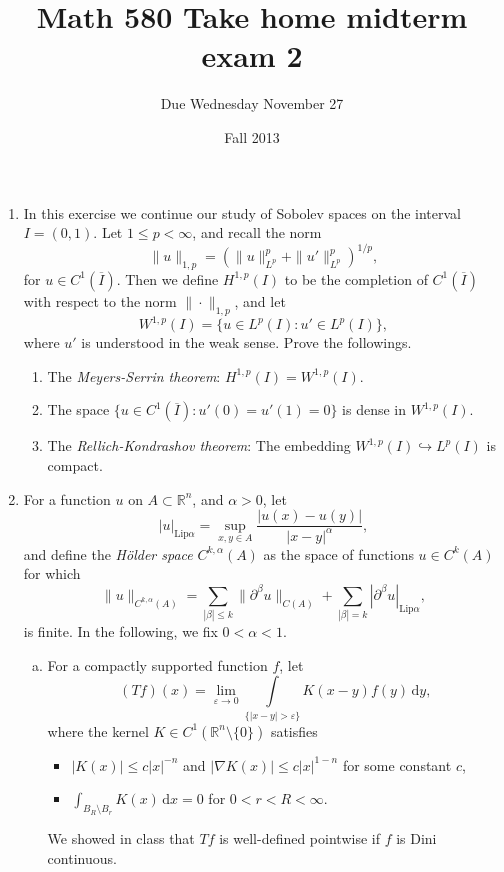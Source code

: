 \documentclass[11pt,reqno]{amsart}
\title{Math 580 Take home midterm exam 2}
\author{Due Wednesday November 27}
\date{Fall 2013}                                           %
\newcommand{\R}{\mathbb{R}}
\newcommand{\eps}{\varepsilon}
\newcommand{\exd}{\mathrm{d}}
\newcommand{\Lip}{\mathrm{Lip}}
\begin{document}
\maketitle

\begin{enumerate}[1.]
\item
In this exercise we continue our study of Sobolev spaces on the interval $I=(0,1)$.
Let $1\leq p < \infty$, and recall the norm
$$
\|u\|_{1,p} = \left( \|u\|_{L^p}^p + \|u'\|_{L^p}^p \right)^{1/p},
$$
for $u\in C^1(\overline I)$.
Then we define $H^{1,p}(I)$ to be the completion of $C^1(\overline I)$ with respect to the norm $\|\cdot\|_{1,p}$,
and let
$$
W^{1,p}(I) = \{ u\in L^p(I) : u' \in L^p(I) \},
$$
where $u'$ is understood in the weak sense.
Prove the followings.
\begin{enumerate}
\item
The {\em Meyers-Serrin theorem}: $H^{1,p}(I)=W^{1,p}(I)$.
\item
The space $\{u\in C^1(\overline I):u'(0)=u'(1)=0\}$ is dense in $W^{1,p}(I)$.
\item
The {\em Rellich-Kondrashov theorem}:
The embedding $W^{1,p}(I)\hookrightarrow L^p(I)$ is compact.
\end{enumerate}
\item
For a function $u$ on $A\subset\R^n$, and $\alpha>0$, let
$$
|u|_{\Lip\alpha} = \sup_{x,y\in A}\frac{|u(x)-u(y)|}{|x-y|^\alpha},
$$
and define the {\em H\"older space} $C^{k,\alpha}(A)$ as the space of functions $u\in C^k(A)$ for which
$$
\|u\|_{C^{k,\alpha}(A)} 
= \sum_{|\beta|\leq k} \|\partial^\beta u\|_{C(A)}
+ \sum_{|\beta|=k} |\partial^\beta u|_{\Lip\alpha},
$$
is finite.
In the following, we fix $0<\alpha<1$.
\begin{enumerate}[(a)]
\item
For a compactly supported function $f$, let 
$$
(Tf)(x) = \lim_{\eps\to0} \int\limits_{\{|x-y|>\eps\}} K(x-y) f(y) \,\exd y,
$$
where the kernel $K\in C^1(\R^n\setminus\{0\})$ satisfies
\begin{itemize}
\item
$|K(x)|\leq c|x|^{-n}$ and $|\nabla K(x)|\leq c|x|^{1-n}$ for some constant $c$,
\item
$\int_{B_R\setminus B_r} K(x) \,\exd x = 0$ for $0<r<R<\infty$.
\end{itemize}
We showed in class that $Tf$ is well-defined pointwise if $f$ is Dini continuous.

\end{enumerate}
\end{enumerate}
\end{document}
